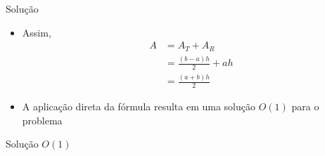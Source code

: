 \begin{frame}[fragile]{Solução}

    \begin{itemize}
        \item Assim,
        \begin{align*}
            A &= A_T + A_R \\
              &= \frac{(b - a)h}{2} + ah \\
              &= \frac{(a + b)h}{2}
        \end{align*}

        \item A aplicação direta da fórmula resulta em uma solução $O(1)$ para o problema
    \end{itemize}

\end{frame}
\begin{frame}[fragile]{Solução $O(1)$}
\end{frame}
